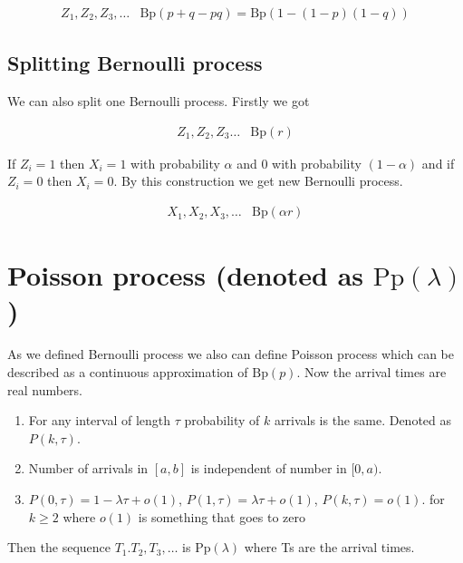 $$
\begin{array}{rl}
Z_{1}, Z_{2}, Z_{3}, \dots & \text{Bp}(p + q - pq) = \text{Bp}(1 - (1-p)(1-q))
\end{array}
$$

\subsection{Splitting Bernoulli process}

We can also split one Bernoulli process. Firstly we got

$$
\begin{array}{rl}
Z_{1}, Z_{2}, Z_{3}\dots & \text{Bp}(r)
\end{array}
$$

If $Z_{i}=1$ then $X_{i} = 1$ with probability $\alpha$ and $0$ with probability $(1 - \alpha)$ and if $Z_{i} = 0$ then $X_{i}=0$. By this construction we get new Bernoulli process.

$$
\begin{array}{rl}
X_{1}, X_{2}, X_{3}, \dots & \text{Bp}(\alpha r)
\end{array}
$$

\section{Poisson process (denoted as $\text{Pp}(\lambda)$)}

As we defined Bernoulli process we also can define Poisson process which can be described as a continuous approximation of $\text{Bp}(p)$. Now the arrival times are real numbers.

\begin{defn}
	\begin{enumerate}
		\item For any interval of length $\tau$ probability of $k$ arrivals is the same. Denoted as $P(k, \tau)$.
		\item Number of arrivals in $[a,b]$ is independent of number in $[0, a)$.
		\item $P(0, \tau) = 1 - \lambda \tau + o(1)$, $P(1, \tau) = \lambda \tau + o(1)$, $P(k, \tau) = o(1)$. for $k \geq 2$ where $o(1)$ is something that goes to zero
	\end{enumerate}
\end{defn}


Then the sequence $T_{1}. T_{2}, T_{3}, \dots$ is $\text{Pp}(\lambda)$ where Ts are the arrival times.

